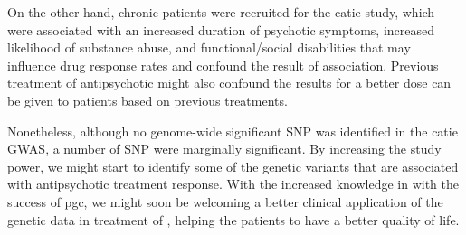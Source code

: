 	On the other hand, chronic  patients were recruited for the \gls{catie} study, which were associated with an increased duration of psychotic symptoms, increased likelihood of substance abuse, and functional/social disabilities that may influence drug response rates and confound the result of association\citep{Zhang2013}.
	Previous treatment of antipsychotic might also confound the results for a better dose can be given to patients based on previous treatments.
	
	Nonetheless, although no genome-wide significant \gls{SNP} was identified in the \gls{catie} \gls{GWAS}, a number of \gls{SNP} were marginally significant. 
	By increasing the study power, we might start to identify some of the genetic variants that are associated with antipsychotic treatment response.
	With the increased knowledge in  with the success of \gls{pgc}, we might soon be welcoming a better clinical application of the genetic data in treatment of , helping the  patients to have a better quality of life.
	
	